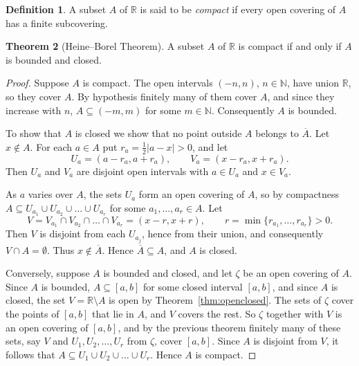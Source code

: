 \documentclass[11pt,a4paper]{article}
\numberwithin{equation}{section}
\theoremstyle{definition}
\newtheorem{thm}{Theorem}[subsection]
\newtheorem{defn}[thm]{Definition}
\begin{document}
\begin{defn}
A subset $A$ of $\mathbb{R}$ is said to be \emph{compact} if every open covering of $A$ has a finite subcovering.
\end{defn}


\begin{thm}[Heine--Borel Theorem]\label{thm:heineborel}
A subset $A$ of $\mathbb{R}$ is compact if and only if $A$ is bounded and closed.
\end{thm}

\begin{proof}
Suppose $A$ is compact. The open intervals $(-n,n)$, $n \in \mathbb{N}$, have union $\mathbb{R}$, so they cover $A$. By hypothesis finitely many of them cover $A$, and since they increase with $n$, $A\subseteq (-m, m)$ for some $m\in \mathbb{N}$. Consequently $A$ is bounded.

To show that $A$ is closed we show that no point outside $A$ belongs to $\overline{A}$. Let $x\notin A$. For each $a\in A$ put $r_a = \frac{1}{2}|a - x| > 0$, and let
$$U_a = (a-r_a, a+r_a),\qquad V_a = (x-r_a, x+r_a).$$
Then $U_a$ and $V_a$ are disjoint open intervals with $a\in U_a$ and $x\in V_a$.

\begin{figure}[H]
\centering
{}
\end{figure}

As $a$ varies over $A$, the sets $U_a$ form an open covering of $A$, so by compactness $A\subseteq U_{a_1} \cup U_{a_2} \cup \dots \cup U_{a_r}$ for some $a_1,\dots,a_r\in A$. Let
$$V = V_{a_1} \cap V_{a_2} \cap \dots \cap V_{a_r} = (x-r, x+r),\qquad r = \min\{r_{a_1},\dots,r_{a_r}\} > 0 .$$
Then $V$ is disjoint from each $U_{a_j}$, hence from their union, and consequently $V\cap A = \emptyset$. Thus $x\notin\overline{A}$. Hence $\overline{A}\subseteq A$, and $A$ is closed.

Conversely, suppose $A$ is bounded and closed, and let $\zeta$ be an open covering of $A$. Since $A$ is bounded, $A\subseteq [a,b]$ for some closed interval $[a,b]$, and since $A$ is closed, the set $V = \mathbb{R} \setminus A$ is open by Theorem~\ref{thm:openclosed}. The sets of $\zeta$ cover the points of $[a,b]$ that lie in $A$, and $V$ covers the rest. So $\zeta$ together with $V$ is an open covering of $[a,b]$, and by the previous theorem finitely many of these sets, say $V$ and $U_1, U_2, \dots, U_r$ from $\zeta$, cover $[a,b]$. Since $A$ is disjoint from $V$, it follows that $A \subseteq U_1 \cup U_2\cup \dots \cup U_r$. Hence $A$ is compact.
\end{proof}
\end{document}
